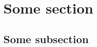 \documentclass[aspectratio=169]{beamer}
\begin{document}
  
\section{Some section}
\subsection{Some subsection}
\begin{frame}[plain]
  \sectionpage
\end{frame}
  
\end{document}
